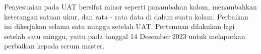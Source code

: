 Penyesuaian pada UAT bersifat minor seperti panambahan kolom, menambahkan keterangan satuan ukur, dan rata - rata data di dalam suatu kolam. Perbaikan ini dikerjakan selama satu minggu setelah UAT. Pertemuan dilakukan lagi setelah satu minggu, yaitu pada tanggal 14 Desember 2023 untuk melaporkan perbaikan kepada scrum master.

